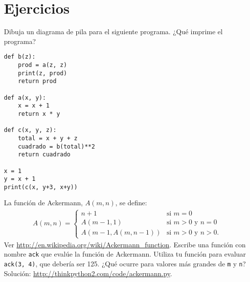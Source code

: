 \documentclass[10pt]{book}
\begin{document}
\section{Ejercicios}

\begin{exercise}

Dibuja un diagrama de pila para el siguiente programa.  ¿Qué imprime el programa?

\begin{verbatim}
def b(z):
    prod = a(z, z)
    print(z, prod)
    return prod

def a(x, y):
    x = x + 1
    return x * y

def c(x, y, z):
    total = x + y + z
    cuadrado = b(total)**2
    return cuadrado

x = 1
y = x + 1
print(c(x, y+3, x+y))
\end{verbatim}

\end{exercise}


\begin{exercise}
\label{ackermann}

La función de Ackermann, $A(m, n)$, se define:
\begin{eqnarray*}
A(m, n) = \begin{cases}
              n+1 & \mbox{si } m = 0 \\
        A(m-1, 1) & \mbox{si } m > 0 \mbox{ y } n = 0 \\
A(m-1, A(m, n-1)) & \mbox{si } m > 0 \mbox{ y } n > 0.
\end{cases}
\end{eqnarray*}
%
Ver \url{http://en.wikipedia.org/wiki/Ackermann_function}.
Escribe una función con nombre {\tt ack} que evalúe la función de Ackermann.
Utiliza tu función para evaluar {\tt ack(3, 4)}, que debería ser 125.
¿Qué ocurre para valores más grandes de {\tt m} y {\tt n}?
Solución: \url{http://thinkpython2.com/code/ackermann.py}.

\end{exercise}
\end{document}
